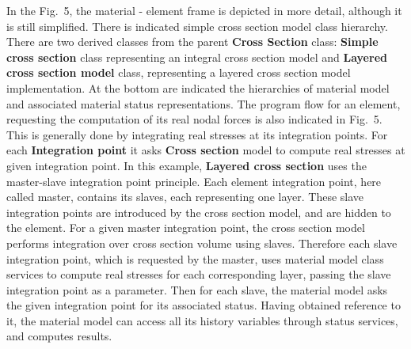 \documentclass[a4paper]{article}
\newcommand{\class}[1]{{\bf #1}}
\begin{document}
In the Fig.~5, the material - element frame is
depicted in more detail, although it is still simplified. There is
indicated simple cross section model class hierarchy. There are two
derived classes from the parent \class{Cross Section} class: \class{Simple cross section}
class representing an integral cross section model and \class{Layered cross
section model} class, representing a layered cross section model
implementation. At the bottom are indicated the hierarchies of material model and
associated material status representations.
The program flow for an element, requesting the computation of its real nodal forces is also
indicated in Fig.~5. This is generally done by integrating real stresses at its integration
points. For each \class{Integration point} it asks \class{Cross section} model to
compute real stresses at given integration point. In this example,
\class{Layered cross section} uses the master-slave integration point
principle. Each element integration point, here called master,
contains its slaves, each representing one layer. These slave
integration points are introduced by the cross section model, and are
hidden to the element. For a given master integration point, the cross section
model performs integration  over cross section
volume using slaves. Therefore  each slave integration point, which is requested
by the master, uses material model class services to compute real
stresses for each corresponding layer, passing the slave integration point as
a parameter. Then for each slave, the material model asks the given integration
point for its associated status.  Having obtained reference to it,
the material model can access all its history variables through status
services, and computes results.
\end{document}
